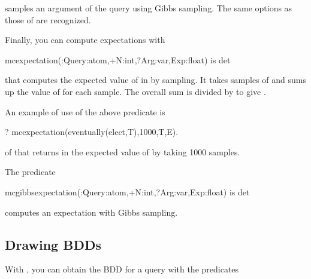 \documentclass[letterpaper,10pt,english]{sphinxmanual}
\begin{document}
samples an argument of the query using Gibbs sampling.
The same options as those of  are recognized.

Finally, you can compute expectations with

\begin{sphinxVerbatim}[commandchars=\\\{\}]
mc\PYGZus{}expectation(:Query:atom,+N:int,?Arg:var,\PYGZhy{}Exp:float) is det
\end{sphinxVerbatim}

that computes the expected value of  in  by sampling.
It takes  samples of  and sums up the value of  for each sample.
The overall sum is divided by  to give .

An example of use of the above predicate is

\begin{sphinxVerbatim}[commandchars=\\\{\}]
?\PYGZhy{} mc\PYGZus{}expectation(eventually(elect,T),1000,T,E).
\end{sphinxVerbatim}

of  that returns in  the expected value
of  by taking 1000 samples.

The predicate

\begin{sphinxVerbatim}[commandchars=\\\{\}]
mc\PYGZus{}gibbs\PYGZus{}expectation(:Query:atom,+N:int,?Arg:var,\PYGZhy{}Exp:float) is det
\end{sphinxVerbatim}

computes an expectation with Gibbs sampling.


\subsection{Drawing BDDs}
\label{\detokenize{index:drawing-bdds}}
With , you can obtain the BDD for a query with the predicates

\begin{sphinxVerbatim}[commandchars=\\\{\}]
  
  
\end{sphinxVerbatim}
\end{document}

